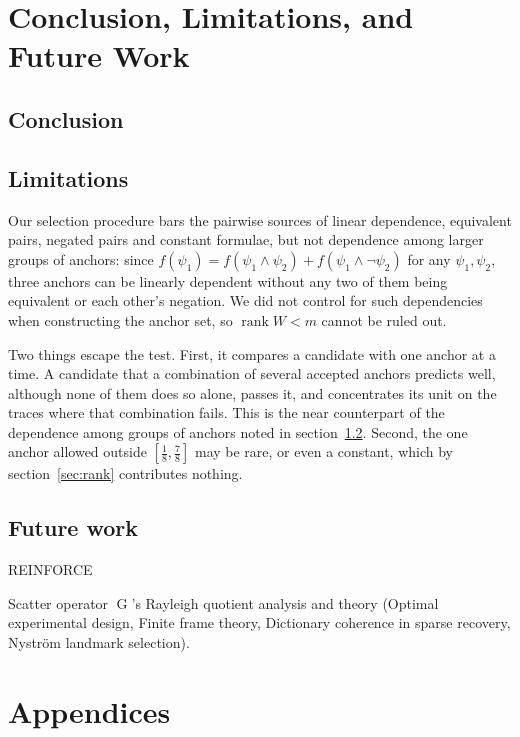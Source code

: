 \documentclass[titlepage,a4paper,11pt]{report}
\begin{document}
    

\chapter{Conclusion, Limitations, and Future Work}

    \section{Conclusion}
    
    \section{Limitations} \label{sec:limitations}
    Our selection procedure bars the pairwise sources of linear dependence, equivalent pairs, negated pairs and constant formulae, but not dependence among larger groups of anchors: since $f(\psi_1)=f(\psi_1\land\psi_2)+f(\psi_1\land\neg\psi_2)$ for any $\psi_1,\psi_2$, three anchors can be linearly dependent without any two of them being equivalent or each other's negation. We did not control for such dependencies when constructing the anchor set, so $\operatorname{rank}W<m$ cannot be ruled out.

    Two things escape the test. First, it compares a candidate with one anchor at a time. A candidate that a combination of several accepted anchors predicts well, although none of them does so alone, passes it, and concentrates its unit on the traces where that combination fails. This is the near counterpart of the dependence among groups of anchors noted in section~\ref{sec:limitations}. Second, the one anchor allowed outside $[\tfrac18,\tfrac78]$ may be rare, or even a constant, which by section~\ref{sec:rank} contributes nothing.
    \section{Future work} \label{sec:future_work}
    REINFORCE

    Scatter operator $\operatorname{G}$'s Rayleigh quotient analysis and theory (Optimal experimental design, Finite frame theory, Dictionary coherence in sparse recovery, Nyström landmark selection).

\clearpage
\printbibliography[heading=bibintoc,title=Bibliography]

\chapter{Appendices}
\end{document}

